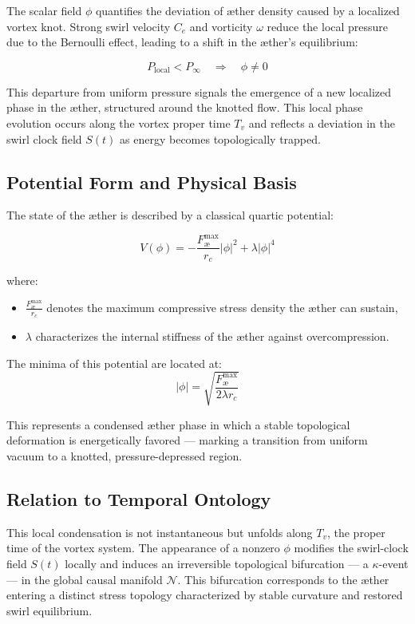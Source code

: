 \documentclass[12pt]{article}
\begin{document}
The scalar field $\phi$ quantifies the deviation of æther density caused by a localized vortex knot. Strong swirl velocity $C_e$ and vorticity $\omega$ reduce the local pressure due to the Bernoulli effect, leading to a shift in the æther's equilibrium:

\[
P_\text{local} < P_\infty \quad \Rightarrow \quad \phi \neq 0
\]

This departure from uniform pressure signals the emergence of a new localized phase in the æther, structured around the knotted flow. This local phase evolution occurs along the vortex proper time $T_v$ and reflects a deviation in the swirl clock field $S(t)$ as energy becomes topologically trapped.

\subsection*{Potential Form and Physical Basis}

The state of the æther is described by a classical quartic potential:

\[
V(\phi) = -\frac{F^{\text{max}}_{\text{\ae}}}{r_c} |\phi|^2 + \lambda |\phi|^4
\]

where:
\begin{itemize}
  \item $\frac{F^{\text{max}}_{\text{\ae}}}{r_c}$ denotes the maximum compressive stress density the æther can sustain,
  \item $\lambda$ characterizes the internal stiffness of the æther against overcompression.
\end{itemize}

The minima of this potential are located at:
\[
|\phi| = \sqrt{\frac{F^{\text{max}}_{\text{\ae}}}{2\lambda r_c}}
\]

This represents a condensed æther phase in which a stable topological deformation is energetically favored — marking a transition from uniform vacuum to a knotted, pressure-depressed region.

\subsection*{Relation to Temporal Ontology}

This local condensation is not instantaneous but unfolds along $T_v$, the proper time of the vortex system. The appearance of a nonzero $\phi$ modifies the swirl-clock field $S(t)$ locally and induces an irreversible topological bifurcation — a $\kappa$-event — in the global causal manifold $\mathcal{N}$. This bifurcation corresponds to the æther entering a distinct stress topology characterized by stable curvature and restored swirl equilibrium.
\end{document}
